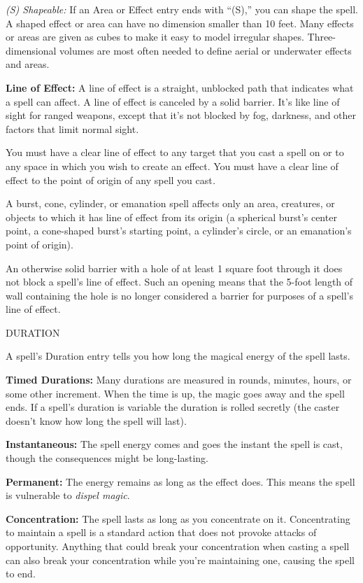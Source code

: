 \documentclass{article}
\begin{document}
\textit{(S) Shapeable: }If an Area or Effect entry ends with ``(S),'' you can shape 
the spell. A shaped effect or area can have no dimension smaller than 10 feet. 
Many effects or areas are given as cubes to make it easy to model irregular shapes. 
Three-dimensional volumes are most often needed to define aerial or underwater 
effects and areas.

\textbf{Line of Effect:} A line of effect is a straight, unblocked path that indicates 
what a spell can affect. A line of effect is canceled by a solid barrier. It's 
like line of sight for ranged weapons, except that it's not blocked by fog, darkness, 
and other factors that limit normal sight.

You must have a clear line of effect to any target that you cast a spell on or 
to any space in which you wish to create an effect. You must have a clear line 
of effect to the point of origin of any spell you cast\textit{.}

A burst, cone, cylinder, or emanation spell affects only an area, creatures, or 
objects to which it has line of effect from its origin (a spherical burst's center 
point, a cone-shaped burst's starting point, a cylinder's circle, or an emanation's 
point of origin).

An otherwise solid barrier with a hole of at least 1 square foot through it does 
not block a spell's line of effect. Such an opening means that the 5-foot length 
of wall containing the hole is no longer considered a barrier for purposes of a 
spell's line of effect.

\vspace{12pt}
DURATION

A spell's Duration entry tells you how long the magical energy of the spell lasts.

\textbf{Timed Durations: }Many durations are measured in rounds, minutes, hours, 
or some other increment. When the time is up, the magic goes away and the spell 
ends. If a spell's duration is variable the duration is rolled secretly (the caster 
doesn't know how long the spell will last). 

\textbf{Instantaneous:} The spell energy comes and goes the instant the spell is 
cast, though the consequences might be long-lasting.

\textbf{Permanent: }The energy remains as long as the effect does. This means the 
spell is vulnerable to \textit{dispel magic}. 

\textbf{Concentration:} The spell lasts as long as you concentrate on it. Concentrating 
to maintain a spell is a standard action that does not provoke attacks of opportunity. 
Anything that could break your concentration when casting a spell can also break 
your concentration while you're maintaining one, causing the spell to end.
\end{document}
